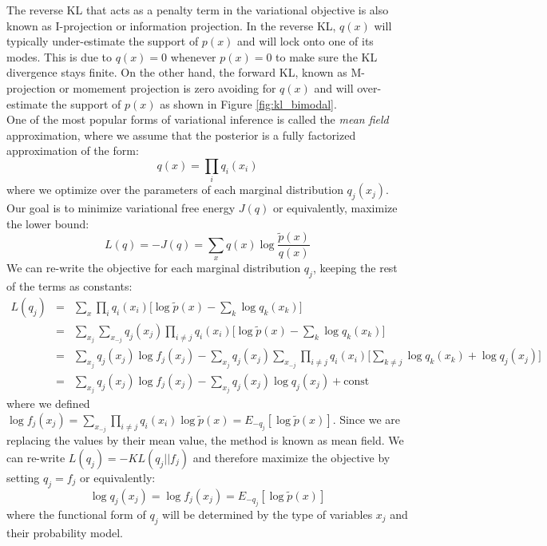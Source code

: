 The reverse KL that acts as a penalty term in the variational objective is also known as I-projection or information projection. In the reverse KL, $q(x)$ will typically under-estimate the support of $p(x)$ and will lock onto one of its modes. This is due to $q(x)=0$ whenever $p(x)=0$ to make sure the KL divergence stays finite. On the other hand, the forward KL, known as M-projection or momement projection is zero avoiding for $q(x)$ and will over-estimate the support of $p(x)$ as shown in Figure \ref{fig:kl_bimodal}.\\

One of the most popular forms of variational inference is called the \textit{mean field} approximation, where we assume that the posterior is a fully factorized approximation of the form:
\begin{equation}
    q(x) = \prod_i q_i(x_i)
\end{equation}
where we optimize over the parameters of each marginal distribution $q_j(x_j)$. Our goal is to minimize variational free energy $J(q)$ or equivalently, maximize the lower bound:
\begin{equation}
    L(q) = -J(q) = \sum_x q(x)\log \frac{\tilde{p}(x)}{q(x)}
\end{equation}
We can re-write the objective for each marginal distribution $q_j$, keeping the rest of the terms as constants:
\begin{eqnarray}
    L(q_j) &=& \sum_x \prod_i q_i(x_i)\bigg[\log \tilde{p}(x) - \sum_k \log q_k(x_k)  \bigg] \\
    &=& \sum_{x_j}\sum_{x_{-j}}q_j(x_j)\prod_{i\neq j}q_i(x_i)\bigg[\log \tilde{p}(x) - \sum_k \log q_k(x_k) \bigg] \\
    &=& \sum_{x_j}q_j(x_j)\log f_j(x_j) - \sum_{x_j}q_j(x_j)\sum_{x_{-j}}\prod_{i\neq j}q_i(x_i)\bigg[\sum_{k\neq j}\log q_k(x_k) + \log q_j(x_j) \bigg] \\
    &=& \sum_{x_j}q_j(x_j)\log f_j(x_j) - \sum_{x_j}q_j(x_j)\log q_j(x_j) + \mathrm{const}
\end{eqnarray}
where we defined $\log f_j(x_j) = \sum_{x_{-j}}\prod_{i\neq j}q_i(x_i)\log \tilde{p}(x) = E_{-q_j}[\log \tilde{p}(x)]$. Since we are replacing the values by their mean value, the method is known as mean field. We can re-write $L(q_j) = -KL(q_j||f_j)$ and therefore maximize the objective by setting $q_j = f_j$ or equivalently:
\begin{equation}
    \log q_j(x_j) = \log f_j(x_j) = E_{-q_j}[\log \tilde{p}(x)]
\end{equation}
where the functional form of $q_j$ will be determined by the type of variables $x_j$ and their probability model.\\

